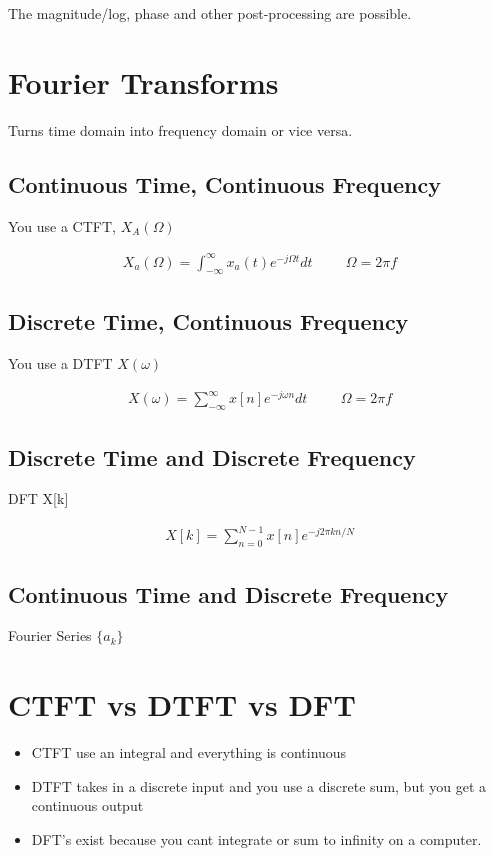 \documentclass[fleqn]{report}
\newcommand{\hp}{\hspace{1cm}}
\newcommand{\equations} [1] {
\begin{gather*}
#1
\end{gather*}
}
\begin{document}
The magnitude/log, phase and other post-processing are possible. 

\section{Fourier Transforms}
Turns time domain into frequency domain or vice versa. 

\subsection{Continuous Time, Continuous Frequency}
You use a CTFT, $X_A(\Omega)$

\equations{
    X_a(\Omega)
    =
    \int^{\infty}_{-\infty}
    x_a(t)
    e^{-j \Omega t}
    dt
    \hp 
    \Omega 
    =
    2 \pi f 
}

\subsection{Discrete Time, Continuous Frequency}
You use a DTFT $X(\omega)$

\equations{
    X(\omega)
    =
    \sum^{\infty}_{-\infty}
    x[n]
    e^{-j \omega n}
    dt
    \hp 
    \Omega 
    =
    2 \pi f 
}
\subsection{Discrete Time and Discrete Frequency}
DFT X[k]

\equations{
    X[k]
    =
    \sum_{n=0}^{N-1}
    x[n]
    e^{-j2 \pi k n / N}
}

\subsection{Continuous Time and Discrete Frequency}
Fourier Series $\{ a_k \}$

\section{CTFT vs DTFT vs DFT}
\begin{itemize}
    \item 
    CTFT use an integral and everything is continuous 
    \item 
    DTFT takes in a discrete input and you use a discrete sum, but 
    you get a continuous output 
    \item 
    DFT's exist because you cant integrate or sum to infinity on a computer.
\end{itemize}
\end{document}
